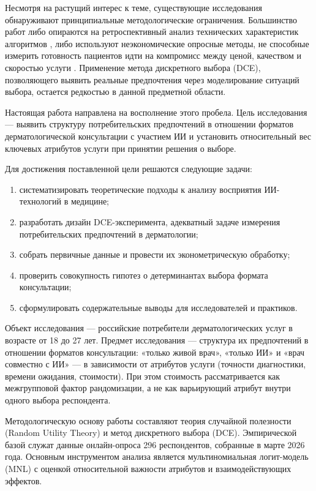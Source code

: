 \documentclass[12pt, a4paper]{article}
\begin{document}
Несмотря на растущий интерес к теме, существующие исследования обнаруживают принципиальные методологические ограничения. Большинство работ либо опираются на ретроспективный анализ технических характеристик алгоритмов \cite{Traini2025}, либо используют неэкономические опросные методы, не способные измерить готовность пациентов идти на компромисс между ценой, качеством и скоростью услуги \cite{Jutzi2020}. Применение метода дискретного выбора (DCE), позволяющего выявить реальные предпочтения через моделирование ситуаций выбора, остается редкостью в данной предметной области.

Настоящая работа направлена на восполнение этого пробела. Цель исследования — выявить структуру потребительских предпочтений в отношении форматов дерматологической консультации с участием ИИ и установить относительный вес ключевых атрибутов услуги при принятии решения о выборе.

Для достижения поставленной цели решаются следующие задачи:
\begin{enumerate}
    \item систематизировать теоретические подходы к анализу восприятия ИИ-технологий в медицине;
    \item разработать дизайн DCE-эксперимента, адекватный задаче измерения потребительских предпочтений в дерматологии;
    \item собрать первичные данные и провести их эконометрическую обработку;
    \item проверить совокупность гипотез о детерминантах выбора формата консультации;
    \item сформулировать содержательные выводы для исследователей и практиков.
\end{enumerate}

Объект исследования — российские потребители дерматологических услуг в возрасте от 18 до 27 лет. Предмет исследования — структура их предпочтений в отношении форматов консультации: «только живой врач», «только ИИ» и «врач совместно с ИИ» — в зависимости от атрибутов услуги (точности диагностики, времени ожидания, стоимости). При этом стоимость рассматривается как межгрупповой фактор рандомизации, а не как варьирующий атрибут внутри одного выбора респондента.

Методологическую основу работы составляют теория случайной полезности (Random Utility Theory) и метод дискретного выбора (DCE). Эмпирической базой служат данные онлайн-опроса 296 респондентов, собранные в марте 2026 года. Основным инструментом анализа является мультиномиальная логит-модель (MNL) с оценкой относительной важности атрибутов и взаимодействующих эффектов.
\end{document}
